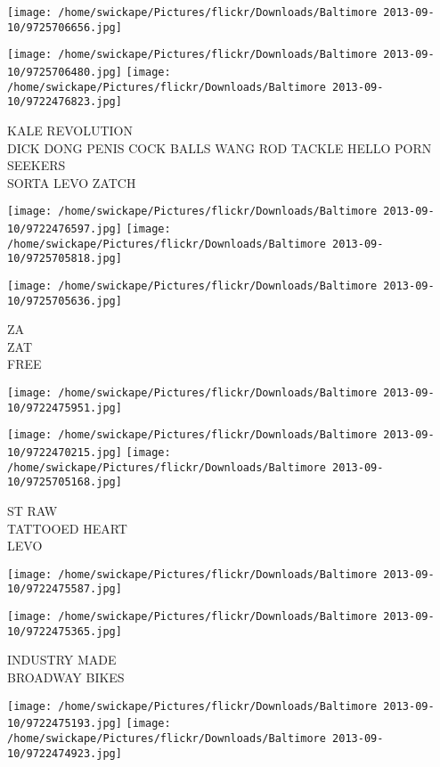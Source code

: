\documentclass[10pt,letterpaper]{article}
\begin{document}
\texttt{[image: /home/swickape/Pictures/flickr/Downloads/Baltimore 2013-09-10/9725706656.jpg]}

\vspace{0.25in}
\texttt{[image: /home/swickape/Pictures/flickr/Downloads/Baltimore 2013-09-10/9725706480.jpg]}
\texttt{[image: /home/swickape/Pictures/flickr/Downloads/Baltimore 2013-09-10/9722476823.jpg]}

KALE REVOLUTION\\
DICK DONG PENIS COCK BALLS WANG ROD TACKLE HELLO PORN SEEKERS\\
SORTA LEVO ZATCH\\
\pagebreak

\texttt{[image: /home/swickape/Pictures/flickr/Downloads/Baltimore 2013-09-10/9722476597.jpg]}
\texttt{[image: /home/swickape/Pictures/flickr/Downloads/Baltimore 2013-09-10/9725705818.jpg]}

\texttt{[image: /home/swickape/Pictures/flickr/Downloads/Baltimore 2013-09-10/9725705636.jpg]}

ZA\\
ZAT\\
FREE\\
\pagebreak

\texttt{[image: /home/swickape/Pictures/flickr/Downloads/Baltimore 2013-09-10/9722475951.jpg]}

\vspace{0.25in}
\texttt{[image: /home/swickape/Pictures/flickr/Downloads/Baltimore 2013-09-10/9722470215.jpg]}
\texttt{[image: /home/swickape/Pictures/flickr/Downloads/Baltimore 2013-09-10/9725705168.jpg]}

ST RAW\\
TATTOOED HEART\\
LEVO\\
\pagebreak

\texttt{[image: /home/swickape/Pictures/flickr/Downloads/Baltimore 2013-09-10/9722475587.jpg]}

\vspace{0.25in}
\texttt{[image: /home/swickape/Pictures/flickr/Downloads/Baltimore 2013-09-10/9722475365.jpg]}

INDUSTRY MADE\\
BROADWAY BIKES\\
\pagebreak

\texttt{[image: /home/swickape/Pictures/flickr/Downloads/Baltimore 2013-09-10/9722475193.jpg]}
\texttt{[image: /home/swickape/Pictures/flickr/Downloads/Baltimore 2013-09-10/9722474923.jpg]}
\end{document}
